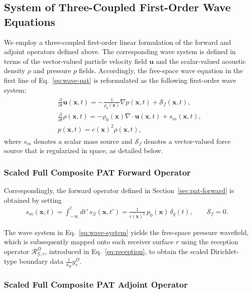 \documentclass[11pt,reqno]{amsart}
\theoremstyle{remark}
\newcommand{\bx}{\boldsymbol{x}}
\newcommand{\bu}{\boldsymbol{u}}
\begin{document}
\subsection{System of Three-Coupled First-Order Wave Equations}

We employ a three-coupled first-order linear formulation of the forward and adjoint operators defined above. The corresponding wave system is defined in terms of the vector‑valued particle velocity field \(\bu\) and the scalar‑valued acoustic density \(\rho\) and pressure \(p\) fields. Accordingly, the free-space wave equation in the first line of Eq.~\eqref{eq:wave-pat} is reformulated as the following first-order wave system:
\begin{align}
\label{eq:wave-system}
\begin{split}
    & \frac{\partial}{\partial t} \bu(\bx, t) = -\frac{1}{\rho_0(\bx)} \nabla p(\bx, t) + \boldsymbol{\mathcal{S}}_f(\bx, t), \\
    & \frac{\partial}{\partial t} \rho(\bx, t) = -\rho_0(\bx) \nabla \cdot \bu(\bx, t) + s_m(\bx, t), \\
    & p(\bx, t) = c(\bx)^2 \rho(\bx, t),
\end{split}
\end{align}
where \(s_m\) denotes a scalar mass source and \(\boldsymbol{\mathcal{S}}_f\) denotes a vector-valued force source that is regularized in space, as detailed below.

\subsubsection{Scaled Full Composite PAT Forward Operator}

Correspondingly, the forward operator defined in Section~\ref{sec:pat-forward} is obtained by setting\cite{Javaherian2022}
\begin{align}  \label{eq:mass-source}
    s_m(\bx, t)
    = \int_{-\infty}^t dt'\, s_{\mathcal{Q}}(\bx, t')
    = \frac{1}{c(\bx)^2}\,p_0(\bx)\,\delta_q(t),
    \qquad
    \boldsymbol{\mathcal{S}}_f = 0.
\end{align}

The wave system in Eq.~\eqref{eq:wave-system} yields the free-space pressure wavefield, which is subsequently mapped onto each receiver surface \(r\) using the reception operator \(\mathcal{R}_{\mathcal{G},r}^D\), introduced in Eq.~\eqref{eq:reception}, to obtain the scaled Dirichlet-type boundary data \(\frac{1}{a_R}y_r^D\).

\subsubsection{Scaled Full Composite PAT Adjoint Operator}
\end{document}
